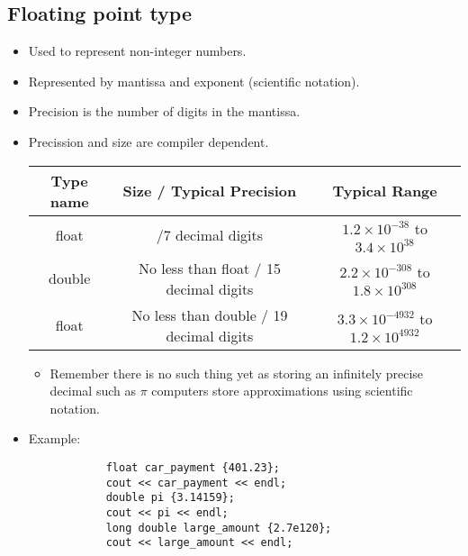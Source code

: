 \subsection{Floating point type}
\begin{itemize}
    \item Used to represent non-integer numbers.
    \item Represented by mantissa and exponent (scientific notation).
    \item Precision is the number of digits in the mantissa.
    \item Precission and size are compiler dependent.
        \begin{center}
            \begin{tabular}{ |c|c|c| }
                \hline
                    Type name & Size / Typical Precision & Typical Range \\
                \hline
                    float & /7 decimal digits & $1.2\times 10^{-38}$ to $3.4\times 10^{38}$  \\ 
                    double & No less than float / 15 decimal digits & $2.2\times 10^{-308}$ to $1.8\times 10^{308}$  \\ 
                    float & No less than double / 19 decimal digits & $3.3\times 10^{-4932}$ to $1.2\times 10^{4932}$  \\ 
                \hline
            \end{tabular}
        \end{center}
        \begin{itemize}
            \item Remember there is no such thing yet as storing an infinitely precise decimal such as $\pi$ computers store approximations using scientific notation.
        \end{itemize}
    \item Example: 
        \begin{verbatim}
            float car_payment {401.23};
            cout << car_payment << endl;
            double pi {3.14159};
            cout << pi << endl;
            long double large_amount {2.7e120};
            cout << large_amount << endl;
        \end{verbatim}
\end{itemize}

